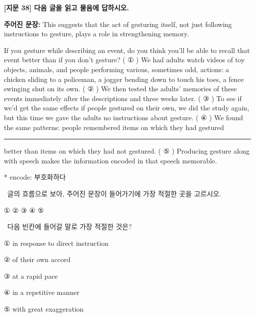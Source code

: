 \documentclass[11pt,a4paper]{article}
\newcommand{\qno}[1]{\par\vspace{8pt}\noindent{\sffamily\bfseries #1.}\ }
\newcommand{\instr}[1]{{\sffamily #1}\par\vspace{3pt}}
\begin{document}
\begin{center}
{\fontsize{15}{17}\selectfont\sffamily\bfseries [지문 38] 다음 글을 읽고 물음에 답하시오.}
\end{center}
\vspace{4pt}

\begin{pbox}
\textbf{주어진 문장:} This suggests that the act of gesturing itself, not just following instructions to gesture, plays a role in strengthening memory.
\end{pbox}

\vspace{4pt}

\begin{pbox}
\hspace{1em}If you gesture while describing an event, do you think you'll be able to recall that event better than if you don't gesture? ( ① ) We had adults watch videos of toy objects, animals, and people performing various, sometimes odd, actions: a chicken sliding to a policeman, a jogger bending down to touch his toes, a fence swinging shut on its own. ( ② ) We then tested the adults' memories of these events immediately after the descriptions and three weeks later. ( ③ ) To see if we'd get the same effects if people gestured on their own, we did the study again, but this time we gave the adults no instructions about gesture. ( ④ ) We found the same patterns: people remembered items on which they had gestured \rule{3.5cm}{0.4pt} better than items on which they had not gestured. ( ⑤ ) Producing gesture along with speech makes the information encoded in that speech memorable.

\vspace{4pt}
\noindent\footnotesize{* encode: 부호화하다}
\end{pbox}

\qno{1}\instr{글의 흐름으로 보아, 주어진 문장이 들어가기에 가장 적절한 곳을 고르시오.}
\begin{choices}
\item ① \quad ② \quad ③ \quad ④ \quad ⑤
\end{choices}

\qno{2}\instr{다음 빈칸에 들어갈 말로 가장 적절한 것은?}
\begin{choices}
\item ① in response to direct instruction
\item ② of their own accord
\item ③ at a rapid pace
\item ④ in a repetitive manner
\item ⑤ with great exaggeration
\end{choices}
\end{document}
